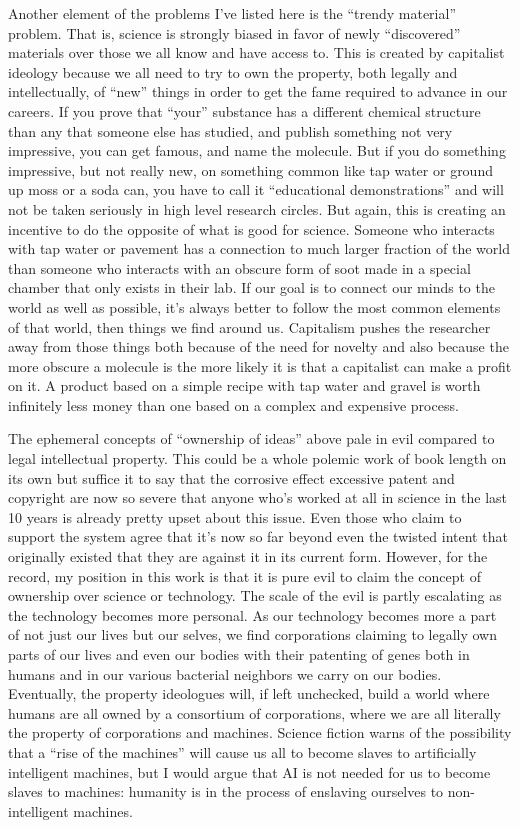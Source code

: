 Another element of the problems I've listed here is the ``trendy
material'' problem. That is, science is strongly biased in favor of
newly ``discovered'' materials over those we all know and have access
to. This is created by capitalist ideology because we all need to try to
own the property, both legally and intellectually, of ``new'' things in
order to get the fame required to advance in our careers. If you prove
that ``your'' substance has a different chemical structure than any that
someone else has studied, and publish something not very impressive, you
can get famous, and name the molecule. But if you do something
impressive, but not really new, on something common like tap water or
ground up moss or a soda can, you have to call it ``educational
demonstrations'' and will not be taken seriously in high level research
circles. But again, this is creating an incentive to do the opposite of
what is good for science. Someone who interacts with tap water or
pavement has a connection to much larger fraction of the world than
someone who interacts with an obscure form of soot made in a special
chamber that only exists in their lab. If our goal is to connect our
minds to the world as well as possible, it's always better to follow the
most common elements of that world, then things we find around us.
Capitalism pushes the researcher away from those things both because of
the need for novelty and also because the more obscure a molecule is the
more likely it is that a capitalist can make a profit on it. A product
based on a simple recipe with tap water and gravel is worth infinitely
less money than one based on a complex and expensive process.

The ephemeral concepts of ``ownership of ideas'' above pale in evil
compared to legal intellectual property. This could be a whole polemic
work of book length on its own but suffice it to say that the corrosive
effect excessive patent and copyright are now so severe that anyone
who's worked at all in science in the last 10 years is already pretty
upset about this issue. Even those who claim to support the system agree
that it's now so far beyond even the twisted intent that originally
existed that they are against it in its current form. However, for the
record, my position in this work is that it is pure evil to claim the
concept of ownership over science or technology. The scale of the evil
is partly escalating as the technology becomes more personal. As our
technology becomes more a part of not just our lives but our selves, we
find corporations claiming to legally own parts of our lives and even
our bodies with their patenting of genes both in humans and in our
various bacterial neighbors we carry on our bodies. Eventually, the
property ideologues will, if left unchecked, build a world where humans
are all owned by a consortium of corporations, where we are all
literally the property of corporations and machines. Science fiction
warns of the possibility that a ``rise of the machines'' will cause us
all to become slaves to artificially intelligent machines, but I would
argue that AI is not needed for us to become slaves to machines:
humanity is in the process of enslaving ourselves to non-intelligent
machines.

